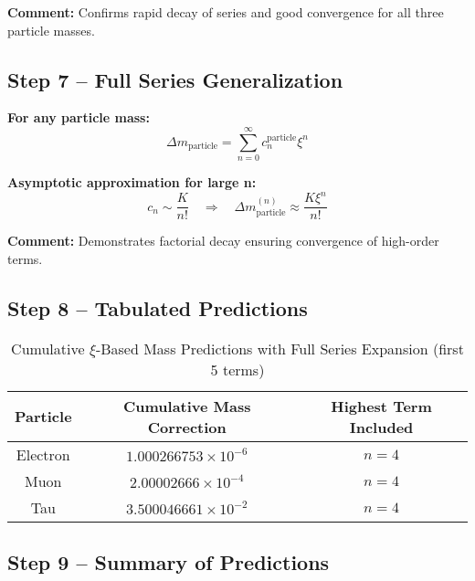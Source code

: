 \documentclass[12pt,a4paper]{article}
\begin{document}
\textbf{Comment:} Confirms rapid decay of series and good convergence for all three particle masses.

\subsection{Step 7 – Full Series Generalization}

\textbf{For any particle mass:}
\begin{equation}
	\Delta m_\text{particle} = \sum_{n=0}^{\infty} c_n^\text{particle} \xi^n
\end{equation}

\textbf{Asymptotic approximation for large n:}
\begin{equation}
	c_n \sim \frac{K}{n!} \quad \Rightarrow \quad \Delta m_\text{particle}^{(n)} \approx \frac{K \xi^n}{n!}
\end{equation}

\textbf{Comment:} Demonstrates factorial decay ensuring convergence of high-order terms.

\subsection{Step 8 – Tabulated Predictions}

\begin{table}[h!]
	\centering
	\begin{tabular}{|c|c|c|}
		\hline
		Particle & Cumulative Mass Correction & Highest Term Included \\
		\hline
		Electron & $1.000266753 \times 10^{-6}$ & $n=4$ \\
		Muon & $2.00002666 \times 10^{-4}$ & $n=4$ \\
		Tau & $3.500046661 \times 10^{-2}$ & $n=4$ \\
		\hline
	\end{tabular}
	\caption{Cumulative $\xi$-Based Mass Predictions with Full Series Expansion (first 5 terms)}
\end{table}

\subsection{Step 9 – Summary of Predictions}
\end{document}
